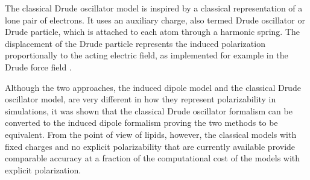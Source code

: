 \documentclass[journal=jpcbfk,manuscript=article]{achemso}
\begin{document}
The classical Drude oscillator model is inspired by a classical representation of a lone pair of electrons. 
It uses an auxiliary charge,
also termed Drude oscillator or Drude particle, 
which is attached to each atom through a harmonic spring.
The displacement of the Drude particle represents the induced polarization proportionally to the acting electric field,
as implemented for example in the Drude force field \citep{lemkul2016empirical}. 

Although the two approaches, 
the induced dipole model and the classical Drude oscillator model, 
are very different in how they represent polarizability in simulations,
it was shown that the classical Drude oscillator formalism can be converted to the induced dipole formalism 
proving the two methods to be equivalent. \citep{huang2017mapping}
From the point of view of lipids, however, the classical models with fixed charges and no explicit polarizability that are currently available 
provide comparable accuracy at a fraction of the computational cost of the models with explicit polarization. \citep{lucas12,chowdhary13} 
\end{document}
